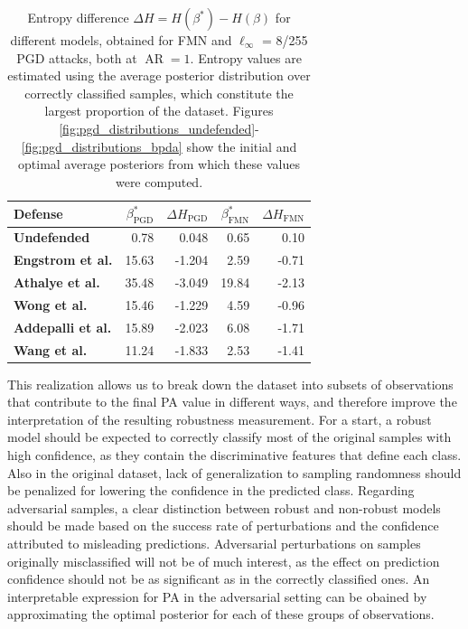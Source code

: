 \begin{table}[H]
    \centering
        \begin{tabular}{l|rr|rr}
        Defense & $\beta^{*}_{\text{PGD}}$ & $\Delta H_{\text{PGD}}$  & $\beta^{*}_{\text{FMN}}$ & $\Delta H_{\text{FMN}}$ \\
        \midrule
        {\color{tab:orange} \textbf{Undefended}} & 0.78 & 0.048 & 0.65 & 0.10\\
        {\color{tab:blue} \textbf{Engstrom et al.}} & 15.63 & -1.204 & 2.59 & -0.71\\
        {\color{tab:green} \textbf{Athalye et al.}} & 35.48 & -3.049 & 19.84 & -2.13 \\
        {\color{tab:red} \textbf{Wong et al.}} & 15.46 & -1.229 & 4.59 & -0.96\\
        {\color{tab:purple} \textbf{Addepalli et al.}} & 15.89 & -2.023 & 6.08 & -1.71 \\
        {\color{tab:brown} \textbf{Wang et al.}} & 11.24 & -1.833 & 2.53 & -1.41\\
        \bottomrule
        \end{tabular}
        \caption{
        Entropy difference $\Delta H = H(\beta^{*}) - H(\beta)$
        for different models, obtained for FMN and $\ell_\infty$ = 8/255 
        PGD attacks, both at $\operatorname{AR} = 1$. Entropy values are 
        estimated using the average posterior distribution over correctly classified
        samples, which constitute the largest proportion of the dataset.
        Figures \ref{fig:pgd_distributions_undefended}-\ref{fig:pgd_distributions_bpda}
        show the initial and optimal average posteriors from which these values
        were computed.
        }
        \label{tab:entropy_gibbs}
\end{table}

This realization allows us to break down the dataset into subsets of observations
that contribute to the final PA value in different ways, and therefore improve
the interpretation of the resulting robustness measurement.
For a start, a robust model should be expected to correctly classify most of the 
original samples with high confidence, as they
contain the discriminative features that define each class. Also in the original 
dataset, lack of generalization to sampling randomness should be penalized for lowering
the confidence in the predicted class. Regarding adversarial samples, a clear
distinction between robust and non-robust models should be made based on the success 
rate of perturbations and the confidence attributed to misleading predictions. Adversarial 
perturbations on samples originally misclassified will not be of much interest,
as the effect on prediction confidence should not be as significant as in
the correctly classified ones. An interpretable expression for PA in the adversarial
setting can be obained by approximating the optimal posterior for each of these
groups of observations. \\

